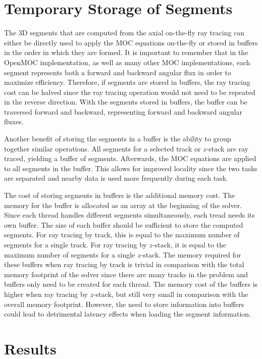 \section{Temporary Storage of Segments}

The 3D segments that are computed from the axial on-the-fly ray tracing can either be directly used to apply the \ac{MOC} equations on-the-fly or stored in buffers in the order in which they are formed. It is important to remember that in the OpenMOC implementation, as well as many other \ac{MOC} implementations, each segment represents both a forward and backward angular flux in order to maximize efficiency. Therefore, if segments are stored in buffers, the ray tracing cost can be halved since the ray tracing operation would not need to be repeated in the reverse direction. With the segments stored in buffers, the buffer can be traversed forward and backward, representing forward and backward angular fluxes.

Another benefit of storing the segments in a buffer is the ability to group together similar operations. All segments for a selected track or $z$-stack are ray traced, yielding a buffer of segments. Afterwards, the \ac{MOC} equations are applied to all segments in the buffer. This allows for improved locality since the two tasks are separated and nearby data is used more frequently during each task.

The cost of storing segments in buffers is the additional memory cost. The memory for the buffer is allocated as an array at the beginning of the solver. Since each thread handles different segments simultaneously, each tread needs its own buffer. The size of each buffer should be sufficient to store the computed segments. For ray tracing by track, this is equal to the maximum number of segments for a single track. For ray tracing by $z$-stack, it is equal to the maximum number of segments for a single $z$-stack. The memory required for these buffers when ray tracing by track is trivial in comparison with the total memory footprint of the solver since there are many tracks in the problem and buffers only need to be created for each thread. The memory cost of the buffers is higher when ray tracing by $z$-stack, but still very small in comparison with the overall memory footprint. However, the need to store information into buffers could lead to detrimental latency effects when loading the segment information.

\section{Results}

